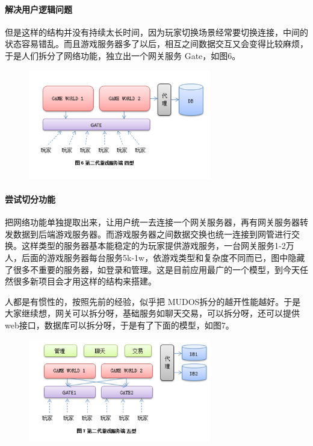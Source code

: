 \documentclass[UTF8,a4paper,8pt]{ctexart}
\begin{document}
			\paragraph{解决用户逻辑问题}但是这样的结构并没有持续太长时间，因为玩家切换场景经常要切换连接，中间的状态容易错乱。而且游戏服务器多了以后，相互之间数据交互又会变得比较麻烦，于是人们拆分了网络功能，独立出一个网关服务 Gate，如图6。
			\begin{figure}[h] 	
				\centering
				\includegraphics[width=8cm,clip]{gameServer6.png} 	
				\label{fig:gameServer6}
			\end{figure} 	
			\paragraph{尝试切分功能}把网络功能单独提取出来，让用户统一去连接一个网关服务器，再有网关服务器转发数据到后端游戏服务器。而游戏服务器之间数据交换也统一连接到网管进行交换。这样类型的服务器基本能稳定的为玩家提供游戏服务，一台网关服务1-2万人，后面的游戏服务器每台服务5k-1w，依游戏类型和复杂度不同而已，图中隐藏了很多不重要的服务器，如登录和管理。这是目前应用最广的一个模型，到今天任然很多新项目会才用这样的结构来搭建。
			
			人都是有惯性的，按照先前的经验，似乎把 MUDOS拆分的越开性能越好。于是大家继续想，网关可以拆分呀，基础服务如聊天交易，可以拆分呀，还可以提供web接口，数据库可以拆分呀，于是有了下面的模型，如图7。
			\begin{figure}[h] 	
				\centering
				\includegraphics[width=8cm,clip]{gameServer7.png} 	
				\label{fig:gameServer7}
			\end{figure} 	
			
\end{document}
